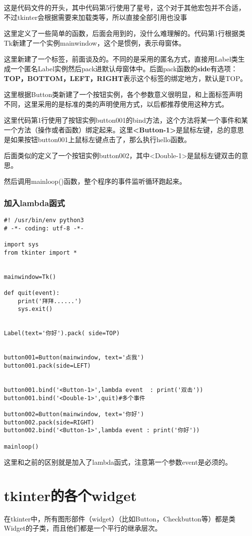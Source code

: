 \documentclass[12pt,oneside]{book}
\begin{document}
\begin{common-format}
这是代码文件的开头，其中代码第5行使用了星号，这个对于其他宏包并不合适，不过tkinter会根据需要来加载类等，所以直接全部引用也没事




这里定义了一些简单的函数，后面会用到的，没什么难理解的。代码第1行根据类Tk新建了一个实例mainwindow，这个是惯例，表示母窗体。


这里新建了一个标签，前面谈及的。不同的是采用的匿名方式，直接用Label类生成一个匿名Label实例然后pack进默认母窗体中。后面pack函数的\textbf{side}有选项：\textbf{TOP，BOTTOM，LEFT，RIGHT}表示这个标签的绑定地方，默认是TOP。


这里根据Button类新建了一个按钮实例，各个参数意义很明显，和上面标签声明不同，这里采用的是标准的类的声明使用方式，以后都推荐使用这种方式。

这里代码第1行使用了按钮实例button001的bind方法，这个方法将某一个事件和某一个方法（操作或者函数）绑定起来。这里\textbf{<Button-1>}是鼠标左键，总的意思是如果按钮button001上鼠标左键点击了，那么执行hello函数。

后面类似的定义了一个按钮实例button002，其中<Double-1>是鼠标左键双击的意思。

然后调用mainloop()函数，整个程序的事件监听循环跑起来。



\subsection{加入lambda函式}
\begin{Verbatim}
#! /usr/bin/env python3
# -*- coding: utf-8 -*-

import sys
from tkinter import *


mainwindow=Tk()

def quit(event):
    print('拜拜......')
    sys.exit()


Label(text='你好').pack( side=TOP)


button001=Button(mainwindow, text='点我')
button001.pack(side=LEFT)


button001.bind('<Button-1>',lambda event  : print('双击'))
button001.bind('<Double-1>',quit)#多个事件

button002=Button(mainwindow, text='你好')
button002.pack(side=RIGHT)
button002.bind('<Button-1>',lambda event : print('你好'))

mainloop()
\end{Verbatim}

这里和之前的区别就是加入了lambda函式，注意第一个参数event是必须的。


\chapter{tkinter的各个widget}
在tkinter中，所有图形部件（widget）（比如Button，Checkbutton等）都是类Widget的子类，而且他们都是一个平行的继承层次。


\end{common-format}
\end{document}
